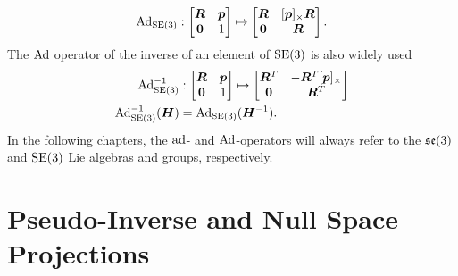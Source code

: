 \begin{align}
    \operatorname{Ad}_{\operatorname{SE}(3)} : \begin{bmatrix}
        \bm{R} & \bm{p} \\
        \bm{0} & 1
    \end{bmatrix}
    \mapsto
    \begin{bmatrix}
        \bm{R} & [\bm{p}]_{\times} \bm{R} \\
        \bm{0} & \bm{R}
    \end{bmatrix}.
\end{align}
The $\operatorname{Ad}$ operator of the inverse of an element of $\operatorname{SE}(3)$ is also widely used
\begin{subequations}
\begin{align}
    \operatorname{Ad}_{\operatorname{SE}(3)}^{-1} &: \begin{bmatrix}
        \bm{R} & \bm{p} \\
        \bm{0} & 1
    \end{bmatrix}
    \mapsto
    \begin{bmatrix}
        \bm{R}^T & - \bm{R}^T [\bm{p}]_{\times} \\
        \bm{0} & \bm{R}^T
    \end{bmatrix} \\
    \operatorname{Ad}_{\operatorname{SE}(3)}^{-1}(\bm{H}) &= \operatorname{Ad}_{\operatorname{SE}(3)}(\bm{H}^{-1}).
\end{align}
\end{subequations}
In the following chapters, the $\operatorname{ad}$- and $\operatorname{Ad}$-operators will always refer to
the $\mathfrak{se}(3)$ and $\operatorname{SE}(3)$ Lie algebras and groups, respectively.

\section{Pseudo-Inverse and Null Space Projections}
\label{sec:pseudoinverse}

